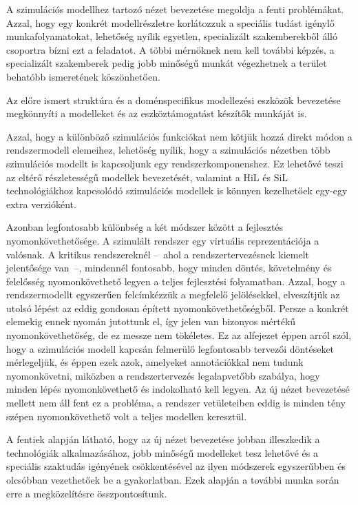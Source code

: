         A szimulációs modellhez tartozó nézet bevezetése megoldja a fenti problémákat.
        Azzal, hogy egy konkrét modellrészletre korlátozzuk a speciális tudást igénylő munkafolyamatokat, lehetőség nyílik egyetlen, specializált szakemberekből álló csoportra bízni ezt a feladatot.
        A többi mérnöknek nem kell további képzés, a specializált szakemberek pedig jobb minőségű munkát végezhetnek a terület behatóbb ismeretének köszönhetően.

        Az előre ismert struktúra és a doménspecifikus modellezési eszközök bevezetése megkönnyíti a modelleket és az eszköztámogatást készítők munkáját is.

        Azzal, hogy a különböző szimulációs funkciókat nem kötjük hozzá direkt módon a rendszermodell elemeihez, lehetőség nyílik, hogy a szimulációs nézetben több szimulációs modellt is kapcsoljunk egy rendszerkomponenshez.
        Ez lehetővé teszi az eltérő részletességű modellek bevezetését, valamint a HiL és SiL technológiákhoz kapcsolódó szimulációs modellek is könnyen kezelhetőek egy-egy extra verzióként.

        Azonban legfontosabb különbség a két módszer között a fejlesztés nyomonkövethetősége. A szimulált rendszer egy virtuális reprezentációja a valósnak.
        A kritikus rendszereknél --~ahol a rendszertervezésnek kiemelt jelentősége van~--, mindennél fontosabb, hogy minden döntés, követelmény és felelősség nyomonkövethető legyen a teljes fejlesztési folyamatban.
        Azzal, hogy a rendszermodellt egyszerűen felcímkézzük a megfelelő jelölésekkel, elveszítjük az utolsó lépést az eddig gondosan épített nyomonkövethetőségből.
        Persze a konkrét elemekig ennek nyomán jutottunk el, így jelen van bizonyos mértékű nyomonkövethetőség, de ez messze nem tökéletes.
        Ez az alfejezet éppen arról szól, hogy a szimulációs modell kapcsán felmerülő legfontosabb tervezői döntéseket mérlegeljük, és éppen ezek azok, amelyeket annotációkkal nem tudunk nyomonkövetni, miközben a rendszertervezés legalapvetőbb szabálya, hogy minden lépés nyomonkövethető és indokolható kell legyen.
        Az új nézet bevezetésé mellett nem áll fent ez a probléma, a rendszer vetületeiben eddig is minden tény szépen nyomonkövethető volt a teljes modellen keresztül.

        A fentiek alapján látható, hogy az új nézet bevezetése jobban illeszkedik a technológiák alkalmazásához, jobb minőségű modelleket tesz lehetővé és a speciális szaktudás igényének csökkentésével az ilyen módszerek egyszerűbben és olcsóbban vezethetőek be a gyakorlatban.
        Ezek alapján a további munka során erre a megközelítésre összpontosítunk.

